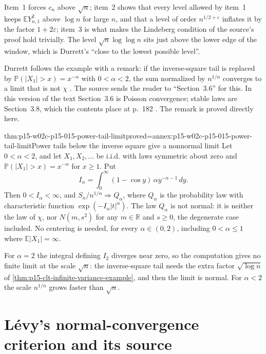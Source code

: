 Item~1 forces \(c_n\) above \(\sqrt n\); item~2 shows that every
level allowed by item~1 keeps \(\mathbb EY_{n,1}^2\) above \(\log n\)
for large \(n\), and that a level of order \(n^{1/2+\varepsilon}\)
inflates it by the factor \(1+2\varepsilon\); item~3 is what makes the Lindeberg condition
of the source's proof hold trivially. The level \(\sqrt n\log\log n\)
sits just above the lower edge of the window, which is Durrett's
``close to the lowest possible level''.

Durrett follows the example with a remark: if the inverse-square tail is
replaced by \(\mathbb P(|X_1|>x)=x^{-\alpha}\) with \(0<\alpha<2\), the
sum normalized by \(n^{1/\alpha}\) converges to a limit that is not
\(\chi\) \cite[p.~152]{DurrettPTEAuthor2019}. The source sends the
reader to ``Section~3.6'' for this. In this version of the text
Section~3.6 is Poisson convergence; stable laws are Section~3.8, which
the contents place at p.~182 \cite[p.~182]{DurrettPTEAuthor2019}. The
remark is proved directly here.

\begin{hbtheorem}{thm:p15-w02c-p15-015-power-tail-limit}{proved=annex:p15-w02c-p15-015-power-tail-limit}{Power tails below the inverse square give a nonnormal limit}
Let \(0<\alpha<2\), and let \(X_1,X_2,\ldots\) be i.i.d. with laws
symmetric about zero and \(\mathbb P(|X_1|>x)=x^{-\alpha}\) for
\(x\geq1\). Put
\[
 I_\alpha=\int_0^\infty(1-\cos y)\,\alpha y^{-\alpha-1}\,dy .
\]
Then \(0<I_\alpha<\infty\), and
\(S_n/n^{1/\alpha}\Rightarrow Q_\alpha\), where \(Q_\alpha\) is the
probability law with characteristic function
\(\exp(-I_\alpha|t|^\alpha)\). The law \(Q_\alpha\) is not normal: it is
neither the law of \(\chi\), nor \(N(m,s^2)\) for any \(m\in\mathbb R\)
and \(s\geq0\), the degenerate case included. No centering is needed,
for every \(\alpha\in(0,2)\), including \(0<\alpha\leq1\) where
\(\mathbb E|X_1|=\infty\).
\end{hbtheorem}

For \(\alpha=2\) the integral defining \(I_2\) diverges near zero, so
the computation gives no finite limit at the scale \(\sqrt n\): the
inverse-square tail needs the extra factor \(\sqrt{\log n}\) of
\cref{thm:p15-clt-infinite-variance-example}, and then the limit is
normal. For \(\alpha<2\) the scale \(n^{1/\alpha}\) grows faster than
\(\sqrt n\).

\section{L\'evy's normal-convergence criterion and its source}
\label{sec:p15-w02c-p15-015-levy-criterion}

